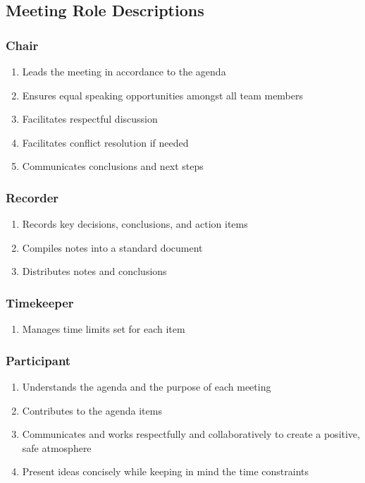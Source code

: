 \documentclass[12pt,letterpaper]{article}
\begin{document}
\subsection{Meeting Role Descriptions}
\subsubsection{Chair}
\begin{enumerate}
    \item Leads the meeting in accordance to the agenda 
    \item Ensures equal speaking opportunities amongst all team members 
    \item Facilitates respectful discussion
    \item Facilitates conflict resolution if needed 
    \item Communicates conclusions and next steps 
\end{enumerate}

\subsubsection{Recorder}
\begin{enumerate}
    \item Records key decisions, conclusions, and action items
    \item Compiles notes into a standard document
    \item Distributes notes and conclusions
\end{enumerate}

\subsubsection{Timekeeper}
\begin{enumerate}
    \item Manages time limits set for each item
\end{enumerate}

\subsubsection{Participant}
\begin{enumerate}
    \item Understands the agenda and the purpose of each meeting 
    \item Contributes to the agenda items 
    \item Communicates and works respectfully and collaboratively to create a positive, safe atmosphere
    \item Present ideas concisely while keeping in mind the time constraints
\end{enumerate}
\end{document}
